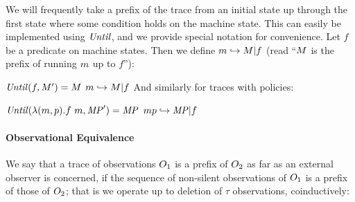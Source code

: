 \documentclass[acmsmall,review,anonymous]{acmart}\settopmatter{printfolios=true,printccs=false,printacmref=false}
\begin{document}
We will frequently take a prefix of the trace from an initial state up
through the first state where some condition holds on the machine state.
This can easily be implemented using \(\mathit{Until}\), and we provide special notation
for convenience.
%
Let \(f\) be a predicate on machine states. Then we define \(m
\hookrightarrow M | f\) (read ``\(M\) is the prefix of
running \(m\) up to \(f\)''): 

            {\(\mathit{Until}(f,M')
              = M\)}
            {\(m \hookrightarrow M | f\)}
\noindent
And similarly for traces with policies:

            {\(\mathit{Until}(\lambda (m,p).f\ m,\mathit{MP}') = \mathit{MP}\)}
         {\(mp \hookrightarrow \mathit{MP} | f\)}


\paragraph*{Observational Equivalence}

We say that a trace of observations $O_1$ is a prefix of $O_2$
as far as an external observer is concerned, if the sequence of
non-silent observations of $O_1$ is a prefix of those of
$O_2$; that is we operate up to deletion of \(\tau\) observations,
coinductively:


\begin{minipage}{.3\textwidth}
  \judgment{}{\(\obsT \lesssim \obsT\)}
\end{minipage}
\begin{minipage}{.3\textwidth}
\judgment{}{\(\tau \lesssim \obsT\)}
\end{minipage}
\begin{minipage}{.3\textwidth}
\end{minipage}
\end{document}
